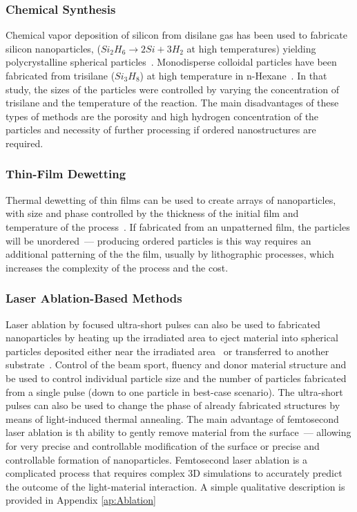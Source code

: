         \subsubsection{Chemical Synthesis}
                Chemical vapor deposition of silicon from disilane gas has been used to fabricate silicon nanoparticles, ($Si_2H_6 \rightarrow 2Si + 3H_2$ at
            high temperatures) yielding polycrystalline spherical particles~\cite{shi2012new}. Monodisperse colloidal particles have been fabricated from trisilane ($Si_3H_8$)
            at high temperature in n-Hexane~\cite{shi2013monodisperse}. In that study, the sizes of the particles were controlled by varying the concentration of trisilane and
            the temperature of the reaction. The main disadvantages of these types of methods are the porosity and high hydrogen concentration of the particles and necessity of
            further processing if ordered nanostructures are required.

        \subsubsection{Thin-Film Dewetting}
                Thermal dewetting of thin films can be used to create arrays of nanoparticles, with size and phase controlled by the thickness of the initial
            film and temperature of the process~\cite{abbarchi2014wafer}. If fabricated from an unpatterned film, the particles will be unordered~--- producing ordered particles is this
            way requires an additional patterning of the the film, usually by lithographic processes, which increases the complexity of the process and the cost.

        \subsubsection{Laser Ablation-Based Methods}
                Laser ablation by focused ultra-short pulses can also be used to fabricated nanoparticles by heating up the irradiated area to eject material into
            spherical particles deposited either near the irradiated area~\cite{kuznetsov2012magnetic} or transferred to another substrate~\cite{zywietz2014laser}. Control of the beam sport, fluency and donor material
            structure and be used to control individual particle size and the number of particles fabricated from a single pulse (down to one particle in best-case
            scenario). The ultra-short pulses can also be used to change the phase of already fabricated structures by means of light-induced thermal annealing.
                The main advantage of femtosecond laser ablation is th ability to gently remove material from the surface~--- allowing for very precise and controllable
            modification of the surface or precise and controllable formation of nanoparticles. Femtosecond laser ablation is a complicated process that requires
            complex 3D simulations to accurately predict the outcome of the light-material interaction. A simple qualitative description is provided in Appendix \ref{ap:Ablation}

